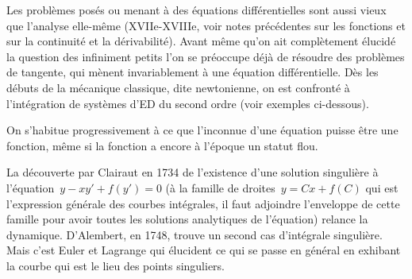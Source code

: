 \medskip
\begin{histoire}%
Les problèmes posés ou menant à des équations différentielles sont aussi vieux que l'analyse elle-même (XVIIe-XVIIIe,
voir notes précédentes sur les fonctions et sur la continuité et la dérivabilité). 
Avant même qu'on ait complètement élucidé la question des infiniment petits 
l'on se préoccupe déjà de résoudre des problèmes de tangente, qui mènent 
invariablement à une équation différentielle. 
Dès les débuts de la mécanique classique, dite newtonienne, on est confronté
à l'intégration de systèmes d'ED du second ordre (voir exemples ci-dessous).

\medskip
On s'habitue progressivement à ce que l'inconnue d'une équation puisse être une fonction, 
même si la fonction a encore à l'époque un statut flou. 

\bigskip
{}

\medskip
La découverte par Clairaut
 en 1734 de l'existence d'une solution singulière
à l'équation~$y - xy' + f(y') = 0$ (à la famille de droites~$y = Cx + f(C)$ qui est l'expression 
générale des courbes intégrales, il faut adjoindre l'enveloppe de cette famille pour avoir toutes 
les solutions analytiques de l'équation) relance la dynamique.
D'Alembert, 
en 1748, trouve un second cas d'intégrale singulière. 
Mais c'est Euler et 
Lagrange 
qui élucident ce qui se passe en général en exhibant la courbe
qui est le lieu des points singuliers.


\end{histoire}
